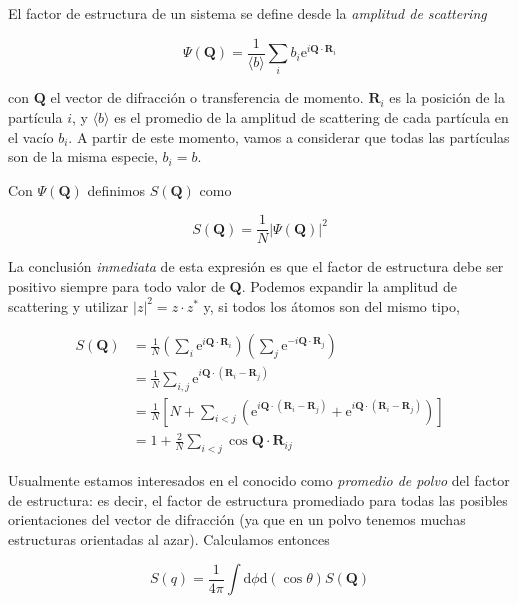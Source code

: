 El factor de estructura de un sistema se define desde la \emph{amplitud de scattering}~\cite{egami_underneath_2003}

\begin{equation}
  \Psi(\mathbf{Q}) = \frac{1}{\langle b\rangle} \sum_i b_i
  \text{e}^{i\mathbf{Q}\cdot\mathbf{R}_i}
  \label{eq:scat_amp}
\end{equation}

con $\mathbf{Q}$ el vector de difracción o transferencia de momento.
$\mathbf{R}_i$ es la posición de la partícula $i$, y $\langle b\rangle$ es el promedio de la amplitud de scattering de cada partícula en el vacío $b_i$.
A partir de este momento, vamos a considerar que todas las partículas son de la misma especie, $b_i = b$.

Con $\Psi(\mathbf{Q})$ definimos $S(\mathbf{Q})$ como

\begin{equation*}
  S(\mathbf{Q}) = \frac{1}{N} |\Psi(\mathbf{Q})|^2
\end{equation*}

La conclusión \emph{inmediata} de esta expresión es que el factor de estructura debe ser positivo siempre para todo valor de $\mathbf{Q}$.
Podemos expandir la amplitud de scattering y utilizar $|z|^2 = z\cdot z^*$  y, si todos los átomos son del mismo tipo,


\begin{align*}
  S(\mathbf{Q}) &= \frac{1}{N} \left( \sum_i \text{e}^{i\mathbf{Q}\cdot\mathbf{R}_i} \right)
  \left( \sum_j \text{e}^{-i\mathbf{Q}\cdot\mathbf{R}_j} \right)\\
  &= \frac{1}{N} \sum_{i, j} \text{e}^{i\mathbf{Q}\cdot(\mathbf{R}_i-\mathbf{R}_j)}\\
  &= \frac{1}{N} \left[N + \sum_{i < j}
    \left(\text{e}^{i\mathbf{Q}\cdot(\mathbf{R}_i-\mathbf{R}_j)} +
      \text{e}^{i\mathbf{Q}\cdot(\mathbf{R}_i-\mathbf{R}_j)}\right)\right]\\
  &= 1 + \frac{2}{N}\sum_{i < j}\cos{\mathbf{Q}\cdot\mathbf{R}_{ij}}
\end{align*}

Usualmente estamos interesados en el conocido como \emph{promedio de polvo} del factor de estructura: es decir, el factor de estructura promediado para todas las posibles orientaciones del vector de difracción (ya que en un polvo tenemos muchas estructuras orientadas al azar).
Calculamos entonces

\begin{equation*}
  S(q) = \frac{1}{4\pi}\int\text{d}\phi\text{d}(\cos\theta) S(\mathbf{Q})
\end{equation*}

